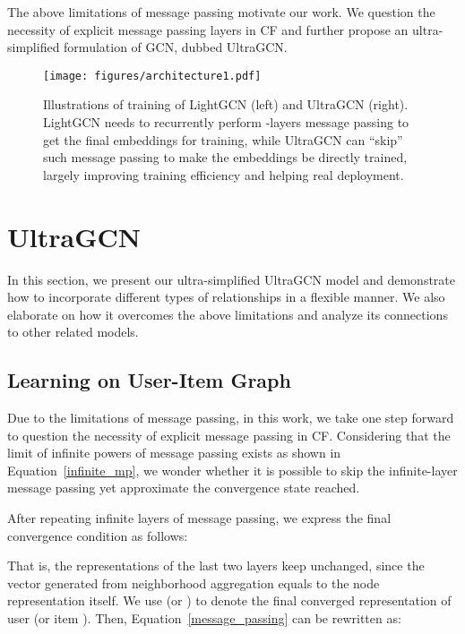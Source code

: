 \documentclass[sigconf,authorversion]{acmart}
\begin{document}
The above limitations of message passing motivate our work. We question the necessity of explicit message passing layers in CF and further propose an ultra-simplified formulation of GCN, dubbed UltraGCN. 

\begin{figure}[!t]
	\centering
	\texttt{[image: figures/architecture1.pdf]}\caption{Illustrations of training of LightGCN (left) and UltraGCN (right). LightGCN needs to recurrently perform -layers message passing to get the final embeddings for training, while UltraGCN can ``skip'' such message passing to make the embeddings be directly trained, largely improving training efficiency and helping real deployment.}\label{architecture}
\end{figure}








\section{U\lowercase{ltra}GCN}

In this section, we present our ultra-simplified UltraGCN model and 
demonstrate how to incorporate different types of relationships in a flexible manner. We also elaborate on how it overcomes the above limitations and analyze its connections to other related models.


\subsection{Learning on User-Item Graph}
\label{learning_on_ui}


Due to the limitations of message passing, in this work, we take one step forward to question the necessity of explicit message passing in CF. Considering that the limit of infinite powers of message passing exists as shown in Equation~\ref{infinite_mp}, we wonder whether it is possible to skip the infinite-layer message passing yet approximate the convergence state reached. 

After repeating infinite layers of message passing, we express the final convergence condition as follows:

That is, the representations of the last two layers keep unchanged, since the vector generated from neighborhood aggregation equals to the node representation itself. We use  (or ) to denote the final converged representation of user  (or item ). Then, Equation~\ref{message_passing} can be rewritten as:
\end{document}
